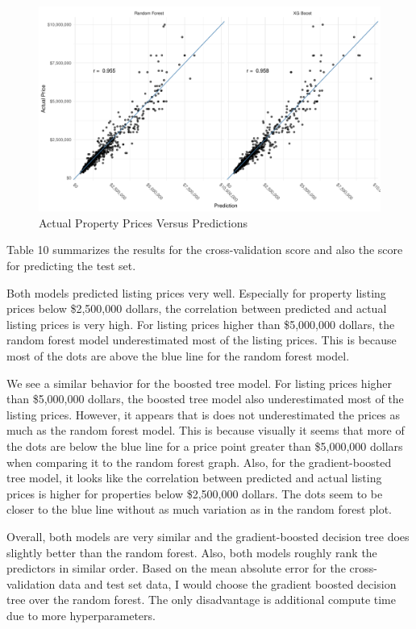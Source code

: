 \documentclass[
]{article}
\begin{document}
\begin{figure}
\centering
\includegraphics{final_report_files/figure-latex/unnamed-chunk-39-1.pdf}
\caption{Actual Property Prices Versus Predictions}
\end{figure}

Table 10 summarizes the results for the cross-validation score and also
the score for predicting the test set.

Both models predicted listing prices very well. Especially for property
listing prices below \$2,500,000 dollars, the correlation between
predicted and actual listing prices is very high. For listing prices
higher than \$5,000,000 dollars, the random forest model underestimated
most of the listing prices. This is because most of the dots are above
the blue line for the random forest model.

We see a similar behavior for the boosted tree model. For listing prices
higher than \$5,000,000 dollars, the boosted tree model also
underestimated most of the listing prices. However, it appears that is
does not underestimated the prices as much as the random forest model.
This is because visually it seems that more of the dots are below the
blue line for a price point greater than \$5,000,000 dollars when
comparing it to the random forest graph. Also, for the gradient-boosted
tree model, it looks like the correlation between predicted and actual
listing prices is higher for properties below \$2,500,000 dollars. The
dots seem to be closer to the blue line without as much variation as in
the random forest plot.

Overall, both models are very similar and the gradient-boosted decision
tree does slightly better than the random forest. Also, both models
roughly rank the predictors in similar order. Based on the mean absolute
error for the cross-validation data and test set data, I would choose
the gradient boosted decision tree over the random forest. The only
disadvantage is additional compute time due to more hyperparameters.
\end{document}
